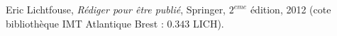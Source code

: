 
\begin{thebibliography}{99}
\bibitem{[Lichtfouse2012]} Eric Lichtfouse, \emph{Rédiger pour être publié}, Springer, $2^{eme}$ édition, 2012
 (cote bibliothèque IMT Atlantique Brest : $0.343$ LICH).

\end{thebibliography}